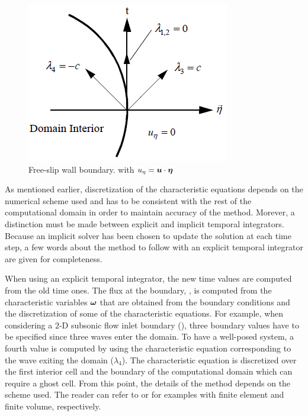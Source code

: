 %
\begin{figure}[H]
\centering
\includegraphics[]{figures/free_slip_wall_bc.png}
\caption{Free-slip wall boundary.\label{fig:wall_bc} with $u_\eta = \boldsymbol u \cdot \boldsymbol\eta$ \cite{RichThesis}}
\end{figure}
%
As mentioned earlier, discretization of the characteristic equations depends on the numerical scheme used and has to be consistent with the rest of the computational domain in order to maintain accuracy of the method. Morever, a distinction must be made between explicit and implicit temporal integrators. Because an implicit solver has been chosen to update the solution at each time step, a few words about the method to follow with an explicit temporal integrator are given for completeness. 

When using an explicit temporal integrator, the new time values are computed from the old time ones. The flux at the boundary, , is computed from the characteristic variables $\boldsymbol\omega$ that are obtained from the boundary conditions and the discretization of some of the characteristic equations. For example, when considering a $2$-D subsonic flow inlet boundary (), three boundary values have to be specified since three waves enter the domain. To have a well-posed system, a fourth value is computed by using the characteristic equation corresponding to the wave exiting the domain ($\lambda_4$). The characteristic equation is discretized over the first interior cell and the boundary of the computational domain which can require a ghost cell. From this point, the details of the method depends on the scheme used. The reader can refer to \cite{RichThesis} or \cite{SEM} for examples with finite element and finite volume, respectively. 


